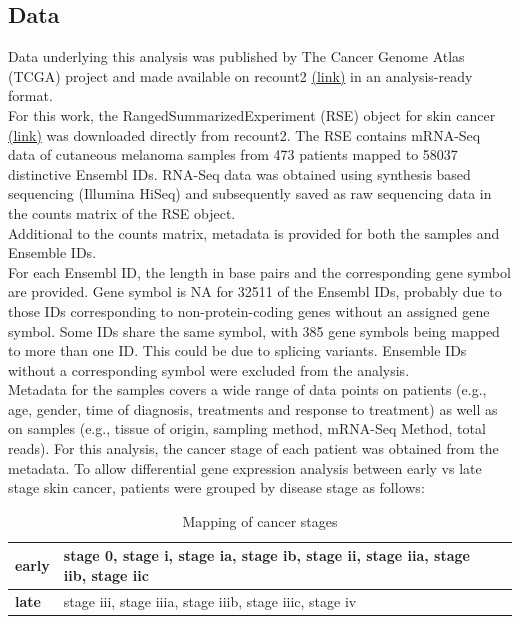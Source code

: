\documentclass[twoside]{article}
\begin{document}
\subsection{Data}
Data underlying this analysis was published by The Cancer Genome Atlas (TCGA) project and made available on recount2 \href{https://jhubiostatistics.shinyapps.io/recount/}{(link)} in an analysis-ready format.\\ 
For this work, the RangedSummarizedExperiment (RSE) object for skin cancer \href{http://duffel.rail.bio/recount/v2/TCGA/rse_gene_skin.Rdata}{(link)} was downloaded directly from recount2.
The RSE contains mRNA-Seq data of cutaneous melanoma samples from 473 patients mapped to 58037 distinctive Ensembl IDs.
RNA-Seq data was obtained using synthesis based sequencing (Illumina HiSeq) and subsequently saved as raw sequencing data  in the counts matrix of the RSE object.\\
Additional to the counts matrix, metadata is provided for both the samples and Ensemble IDs.\\For each Ensembl ID,  the length in base pairs and the corresponding gene symbol are provided. 
Gene symbol is NA for 32511 of the Ensembl IDs, probably due to those IDs corresponding to non-protein-coding genes without an assigned gene symbol. Some IDs share the same symbol, with 385 gene symbols being mapped to more than one ID. This could be due to splicing variants. Ensemble IDs without a corresponding symbol were excluded from the analysis.\\
Metadata for the samples covers a wide range of data points on patients (e.g., age, gender, time of diagnosis, treatments and response to treatment) as well as on samples (e.g., tissue of origin, sampling method, mRNA-Seq Method, total reads). For this analysis, the cancer stage of each patient was obtained from the metadata. To allow differential gene expression analysis between early vs late stage skin cancer, patients were grouped by disease stage as follows:\\

\begin{table}[!htb]
\centering
\caption{Mapping of cancer stages}\label{tab:my_lable}
\begin{tabular}{@{}lll@{}}
\toprule
\textbf{early} & stage 0, stage i, stage ia, stage ib, stage ii, stage iia, stage iib, stage iic \\ \midrule
\textbf{late} & stage iii, stage iiia, stage iiib, stage iiic, stage iv  \\ \bottomrule
\end{tabular}
\end{table}
\end{document}
